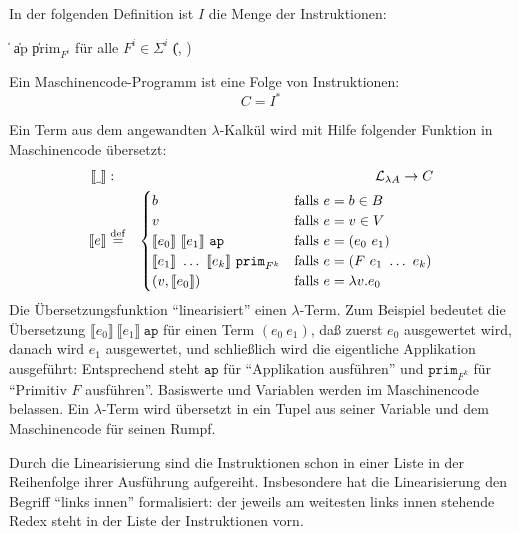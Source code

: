 \begin{definition}[Maschinencode]\label{def:secd-code}
  In der folgenden Definition ist $I$ die Menge der Instruktionen:
  \begin{grammar}
     \: 
    \> \| 
    \> \| ap
    \> \| prim$_{F^i}$ \textrm{für alle $F^i \in \Sigma^i$}
    \> \| (, )
  \end{grammar}
  Ein Maschinencode-Programm ist eine Folge von Instruktionen:
  \begin{displaymath}
    C = I^\ast
  \end{displaymath}
\end{definition}

Ein Term aus dem angewandten $\lambda$-Kalkül wird mit Hilfe folgender
Funktion in Maschinencode übersetzt:
%
\begin{eqnarray*}
  \llbracket \underline{~} \rrbracket &:& \mathcal{L}_{\lambda{}A}
  \rightarrow C\\
  \llbracket e \rrbracket &\stackrel{\rm def}{=}&
  \begin{cases}
    b & \textrm{falls $e = b \in B$}\\
    v & \textrm{falls $e = v \in V$}\\
    \llbracket e_0\rrbracket~\llbracket e_1\rrbracket~\mathtt{ap}
    & \textrm{falls $e = (e_0~e_1)$}\\
    \llbracket e_1\rrbracket~\ldots~\llbracket e_k\rrbracket~\mathtt{prim}_{F^k}
    & \textrm{falls $e = (F~e_1~\ldots~e_k)$}\\
    (v, \llbracket e_0\rrbracket) & \textrm{falls $e = \lambda v.e_0$}
  \end{cases}
\end{eqnarray*}
%
Die Übersetzungsfunktion "`linearisiert"' einen $\lambda$-Term.  Zum
Beispiel bedeutet die Übersetzung $\llbracket e_0\rrbracket~\llbracket
e_1\rrbracket~\mathtt{ap}$ für einen Term $(e_0~e_1)$, daß zuerst
$e_0$ ausgewertet wird, danach wird $e_1$ ausgewertet, und schließlich wird die
eigentliche Applikation ausgeführt:  Entsprechend steht $\mathtt{ap}$
für "`Applikation ausführen"' und $\mathtt{prim}_{F^k}$ für "`Primitiv
$F$ ausführen"'.  Basiswerte und Variablen werden im Maschinencode
belassen.  Ein $\lambda$-Term wird übersetzt in ein Tupel aus seiner
Variable und dem Maschinencode für seinen Rumpf.

Durch die Linearisierung sind die Instruktionen schon in einer Liste in der
Reihenfolge ihrer Ausführung aufgereiht.  Insbesondere hat die
Linearisierung den Begriff "`links innen"' formalisiert: der jeweils
am weitesten links innen stehende Redex steht in der Liste der
Instruktionen vorn.

